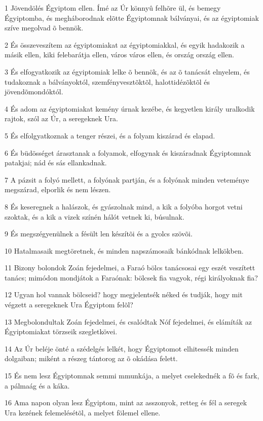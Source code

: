 \par 1 Jövendölés Égyiptom ellen. Ímé az Úr könnyû felhõre ül, és bemegy Égyiptomba, és megháborodnak elõtte Égyiptomnak  bálványai, és az égyiptomiak szíve megolvad õ bennök.
\par 2 És összeveszítem az égyiptomiakat az égyiptomiakkal, és egyik hadakozik a másik ellen, kiki felebarátja ellen, város város ellen, és ország ország ellen.
\par 3 És elfogyatkozik az égyiptomiak lelke õ bennök, és az õ tanácsát elnyelem, és tudakoznak a bálványoktól, szemfényvesztõktõl, halottidézõktõl és jövendõmondóktól.
\par 4 És adom az égyiptomiakat kemény úrnak kezébe, és kegyetlen király uralkodik rajtok, szól az Úr, a seregeknek Ura.
\par 5 És elfolgyatkoznak a tenger részei, és a folyam kiszárad és elapad.
\par 6 És büdösséget árasztanak a folyamok, elfogynak és kiszáradnak Égyiptomnak patakjai; nád és sás ellankadnak.
\par 7 A pázsit a folyó mellett, a folyónak partján, és a folyónak minden veteménye megszárad, elporlik és nem lészen.
\par 8 És keseregnek a halászok, és gyászolnak mind, a kik a folyóba horgot vetni szoktak, és a kik a vizek színén hálót vetnek ki, búsulnak.
\par 9 És megszégyenülnek a fésült len készítõi és a gyolcs szövõi.
\par 10 Hatalmasaik megtöretnek, és minden napszámosaik bánkódnak lelkökben.
\par 11 Bizony bolondok Zoán fejedelmei, a Faraó bölcs tanácsosai egy eszét veszített tanács; mimódon mondjátok a Faraónak: bölcsek fia vagyok, régi királyoknak fia?
\par 12 Ugyan hol vannak bölcseid? hogy megjelentsék néked és tudják, hogy mit végzett a seregeknek Ura Égyiptom felõl?
\par 13 Megbolondultak Zoán fejedelmei, és csalódtak Nóf fejedelmei, és elámíták az Égyiptomiakat törzseik szegletkövei.
\par 14 Az Úr beléje önté a szédelgés lelkét, hogy Égyiptomot elhitessék minden dolgaiban; miként a részeg tántorog az õ okádása felett.
\par 15 És nem lesz Égyiptomnak semmi mmunkája, a melyet cselekednék a fõ és fark, a pálmaág és a káka.
\par 16 Ama napon olyan lesz Égyiptom, mint az asszonyok, retteg és fél a seregek Ura kezének felemelésétõl, a melyet fölemel ellene.
